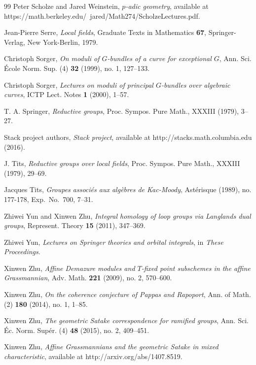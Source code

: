 \begin{thebibliography}{99}
 Peter Scholze and Jared Weinstein, \emph{$p$-adic geometry}, available at https://math.berkeley.edu/~jared/Math274/ScholzeLectures.pdf.

 Jean-Pierre Serre, \emph{Local fields}, Graduate Texts in Mathematics \textbf{67}, Springer-Verlag, New York-Berlin, 1979.

 Christoph Sorger, \emph{On moduli of $G$-bundles of a curve for exceptional $G$}, Ann. Sci. \'Ecole Norm. Sup. (4) \textbf{32} (1999), no. 1, 127--133.

 Christoph Sorger, \emph{Lectures on moduli of principal $G$-bundles over algebraic curves}, ICTP Lect. Notes \textbf{1} (2000), 1--57.

 T. A. Springer, \emph{Reductive groups}, Proc. Sympos. Pure Math., XXXIII (1979), 3--27.

 Stack project authors, \emph{Stack project}, available at http://stacks.math.columbia.edu (2016).

 J. Tits, \emph{Reductive groups over local fields}, Proc. Sympos. Pure Math., XXXIII (1979), 29--69.

 Jacques Tits, \emph{Groupes associ\'es aux alg\`ebres de Kac-Moody}, Ast\'erisque (1989), no. 177-178, Exp.\ No.\ 700, 7--31.

 Zhiwei Yun and Xinwen Zhu, \emph{Integral homology of loop groups via Langlands dual groups}, Represent. Theory \textbf{15} (2011), 347--369.

 Zhiwei Yun, \emph{Lectures on Springer theories and orbital integrals}, in \emph{These Proceedings}.

 Xinwen Zhu, \emph{Affine Demazure modules and $T$-fixed point subschemes in the affine Grassmannian}, Adv. Math. \textbf{221} (2009), no. 2, 570--600.

 Xinwen Zhu, \emph{On the coherence conjecture of Pappas and Rapoport}, Ann. of Math. (2) \textbf{180} (2014), no. 1, 1--85.

 Xinwen Zhu, \emph{The geometric Satake correspondence for ramified groups}, Ann. Sci. \'Ec. Norm. Sup\'er. (4) \textbf{48} (2015), no. 2, 409--451.

 Xinwen Zhu, \emph{Affine Grassmannians and the geometric Satake in mixed characteristic}, available at http://arxiv.org/abs/1407.8519.

\end{thebibliography}

